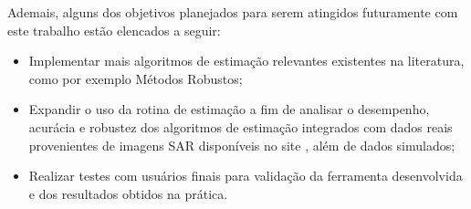 Ademais, alguns dos objetivos planejados para serem atingidos futuramente com este trabalho estão elencados a seguir:
\begin{itemize}
    \item Implementar mais algoritmos de estimação relevantes existentes na literatura, como por exemplo Métodos Robustos;
    \item Expandir o uso da rotina de estimação a fim de analisar o desempenho, acurácia e robustez dos algoritmos de estimação integrados com dados reais provenientes de imagens SAR disponíveis no site \citet{PoISARpro}, além de dados simulados;
    \item Realizar testes com usuários finais para validação da ferramenta desenvolvida e dos resultados obtidos na prática.
\end{itemize}